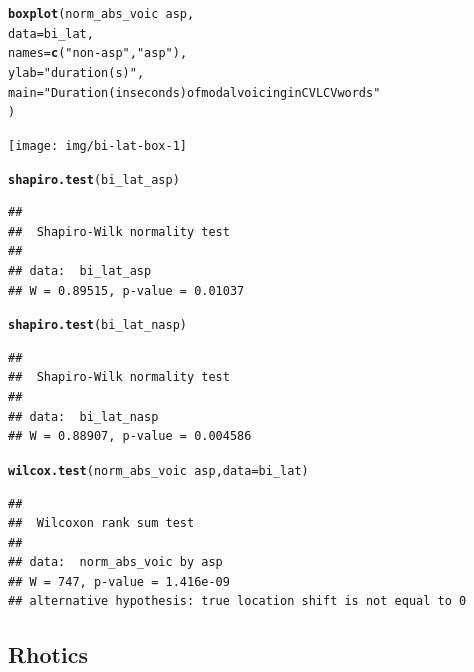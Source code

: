 \documentclass[a4paper,11pt]{article}\usepackage[]{graphicx}\usepackage[]{color}
\makeatletter
\newcommand{\hlstr}[1]{\textcolor[rgb]{0.192,0.494,0.8}{#1}}%
\newcommand{\hlopt}[1]{\textcolor[rgb]{0,0,0}{#1}}%
\newcommand{\hlstd}[1]{\textcolor[rgb]{0.345,0.345,0.345}{#1}}%
\newcommand{\hlkwc}[1]{\textcolor[rgb]{0.333,0.667,0.333}{#1}}%
\newcommand{\hlkwd}[1]{\textcolor[rgb]{0.737,0.353,0.396}{\textbf{#1}}}%
\newenvironment{kframe}{%
 \def\at@end@of@kframe{}%
 \ifinner\ifhmode%
  \def\at@end@of@kframe{\end{minipage}}%
  \begin{minipage}{\columnwidth}%
 \fi\fi%
 \def\FrameCommand##1{\hskip\@totalleftmargin \hskip-\fboxsep
 \colorbox{shadecolor}{##1}\hskip-\fboxsep
     \hskip-\linewidth \hskip-\@totalleftmargin \hskip\columnwidth}%
 \MakeFramed {\advance\hsize-\width
   \@totalleftmargin\z@ \linewidth\hsize
   \@setminipage}}%
 {\par\unskip\endMakeFramed%
 \at@end@of@kframe}
\newenvironment{knitrout}{}{} %
\makeatother
\begin{document}
\begin{knitrout}
\color{fgcolor}\begin{kframe}
\begin{alltt}
\hlkwd{boxplot}\hlstd{(norm_abs_voic} \hlopt{~} \hlstd{asp,}
        \hlkwc{data} \hlstd{= bi_lat,}
        \hlkwc{names} \hlstd{=} \hlkwd{c}\hlstd{(}\hlstr{"non-asp"}\hlstd{,} \hlstr{"asp"}\hlstd{),}
        \hlkwc{ylab} \hlstd{=} \hlstr{"duration (s)"}\hlstd{,}
        \hlkwc{main} \hlstd{=} \hlstr{"Duration (in seconds) of modal voicing in CVLCV words"}
        \hlstd{)}
\end{alltt}
\end{kframe}

{\centering \texttt{[image: img/bi-lat-box-1]} 

}



\end{knitrout}

\begin{knitrout}
\color{fgcolor}\begin{kframe}
\begin{alltt}
\hlkwd{shapiro.test}\hlstd{(bi_lat_asp)}
\end{alltt}
\begin{verbatim}
## 
## 	Shapiro-Wilk normality test
## 
## data:  bi_lat_asp
## W = 0.89515, p-value = 0.01037
\end{verbatim}
\begin{alltt}
\hlkwd{shapiro.test}\hlstd{(bi_lat_nasp)}
\end{alltt}
\begin{verbatim}
## 
## 	Shapiro-Wilk normality test
## 
## data:  bi_lat_nasp
## W = 0.88907, p-value = 0.004586
\end{verbatim}
\begin{alltt}
\hlkwd{wilcox.test}\hlstd{(norm_abs_voic} \hlopt{~} \hlstd{asp,} \hlkwc{data} \hlstd{= bi_lat)}
\end{alltt}
\begin{verbatim}
## 
## 	Wilcoxon rank sum test
## 
## data:  norm_abs_voic by asp
## W = 747, p-value = 1.416e-09
## alternative hypothesis: true location shift is not equal to 0
\end{verbatim}
\end{kframe}
\end{knitrout}

\subsection{Rhotics}
\end{document}
